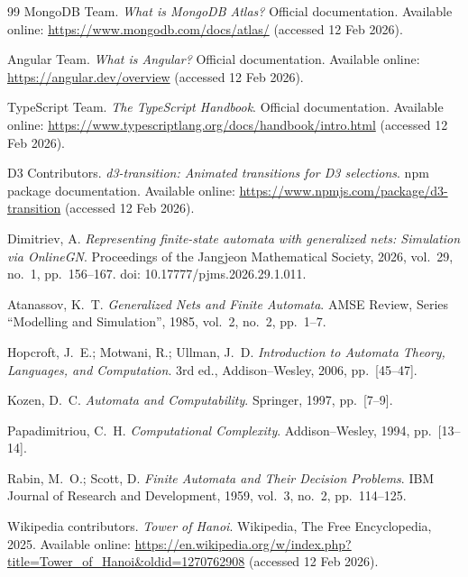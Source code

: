\begin{thebibliography}{99}
 MongoDB Team.
\newblock \emph{What is MongoDB Atlas?}
\newblock Official documentation.
\newblock Available online: \url{https://www.mongodb.com/docs/atlas/} (accessed 12 Feb 2026).

Angular Team.
\newblock \emph{What is Angular?}
\newblock Official documentation.
\newblock Available online: \url{https://angular.dev/overview} (accessed 12 Feb 2026).

TypeScript Team.
\newblock \emph{The TypeScript Handbook}.
\newblock Official documentation.
\newblock Available online: \url{https://www.typescriptlang.org/docs/handbook/intro.html} (accessed 12 Feb 2026).

D3 Contributors.
\newblock \emph{d3-transition: Animated transitions for D3 selections}.
\newblock npm package documentation.
\newblock Available online: \url{https://www.npmjs.com/package/d3-transition} (accessed 12 Feb 2026).

Dimitriev, A.
\newblock \emph{Representing finite-state automata with generalized nets: Simulation via OnlineGN}.
\newblock Proceedings of the Jangjeon Mathematical Society, 2026, vol.~29, no.~1, pp.~156--167.
\newblock doi: 10.17777/pjms.2026.29.1.011.

Atanassov, K.~T.
\newblock \emph{Generalized Nets and Finite Automata}.
\newblock AMSE Review, Series ``Modelling and Simulation'', 1985, vol.~2, no.~2, pp.~1--7.

Hopcroft, J.~E.; Motwani, R.; Ullman, J.~D.
\newblock \emph{Introduction to Automata Theory, Languages, and Computation}.
\newblock 3rd ed., Addison--Wesley, 2006, pp.~[45--47].

Kozen, D.~C.
\newblock \emph{Automata and Computability}.
\newblock Springer, 1997, pp.~[7--9].

Papadimitriou, C.~H.
\newblock \emph{Computational Complexity}.
\newblock Addison--Wesley, 1994, pp.~[13--14].

Rabin, M.~O.; Scott, D.
\newblock \emph{Finite Automata and Their Decision Problems}.
\newblock IBM Journal of Research and Development, 1959, vol.~3, no.~2, pp.~114--125.

Wikipedia contributors.
\newblock \emph{Tower of Hanoi}.
\newblock Wikipedia, The Free Encyclopedia, 2025.
\newblock Available online: \url{https://en.wikipedia.org/w/index.php?title=Tower_of_Hanoi&oldid=1270762908} (accessed 12 Feb 2026).


\end{thebibliography}
